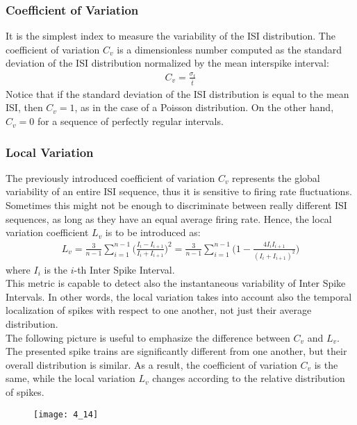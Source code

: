 \subsubsection{Coefficient of Variation}
It is the simplest index to measure the variability of the ISI distribution. The
coefficient of variation \(C_v\) is a dimensionless number computed as the
standard deviation of the ISI distribution normalized by the mean interspike interval:
\begin{align*}
    C_v=\frac{\sigma_t}{\overline{t}}
\end{align*}
Notice that if the standard deviation of the ISI distribution is equal to the mean ISI, then
\(C_v=1\), as in the case of a Poisson distribution. On the other hand,
\(C_v=0\) for a sequence of perfectly regular intervals.
\subsubsection{Local Variation}
The previously introduced coefficient of variation \(C_v\) represents the global
variability of an entire ISI sequence, thus it is sensitive to firing rate
fluctuations. Sometimes this might not be enough to discriminate between really
different ISI sequences, as long as they have an equal average firing rate. Hence,
the local variation coefficient \(L_v\) is to be introduced as:
\begin{align*}
    L_v
    =\frac{3}{n-1}\sum_{i=1}^{n-1}\biggl(\frac{I_{i}-I_{i+1}}{I_{i}+I_{i+1}}\biggr)^2
    =\frac{3}{n-1}\sum_{i=1}^{n-1}\biggl(1-\frac{4I_{i}I_{i+1}}{(I_{i}+I_{i+1})^2}\biggr)
\end{align*}
where \(I_i\) is the \(i\)-th Inter Spike Interval.\\
This metric is capable to detect also the instantaneous variability of Inter Spike
Intervals. In other words, the local variation takes into account also the
temporal localization of spikes with respect to one another, not just their
average distribution.\\
The following picture is useful to emphasize the difference between
\(C_v\) and \(L_v\). The presented spike trains are significantly different from
one another, but their overall distribution is similar. As a result, the
coefficient of variation \(C_v\) is the same, while the local variation \(L_v\)
changes according to the relative distribution of spikes.
\begin{figure}[H]
    \texttt{[image: 4\_14]}
    \centering
\end{figure}
